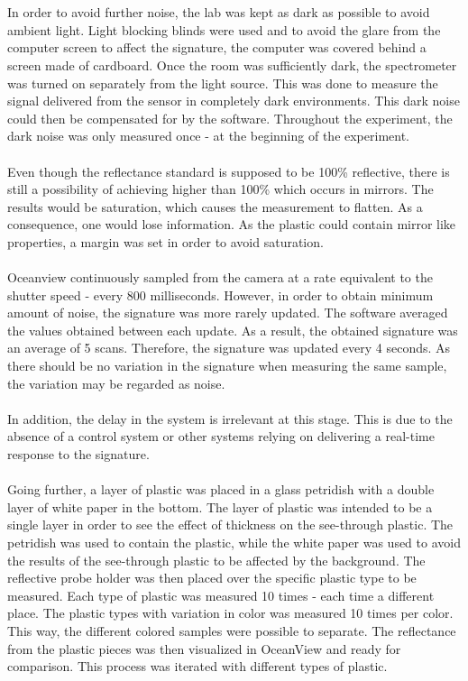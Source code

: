 \\\\
\noindent
In order to avoid further noise, the lab was kept as dark as possible to avoid ambient light. Light blocking blinds were used and to avoid the glare from the computer screen to affect the signature, the computer was covered behind a screen made of cardboard. Once the room was sufficiently dark, the spectrometer was turned on separately from the light source. This was done to measure the signal delivered from the sensor in completely dark environments. This dark noise could then be compensated for by the software. Throughout the experiment, the dark noise was only measured once - at the beginning of the experiment.
\\\\
Even though the reflectance standard is supposed to be 100\% reflective, there is still a possibility of achieving higher than 100\% which occurs in mirrors. The results would be saturation, which causes the measurement to flatten. As a consequence, one would lose information. As the plastic could contain mirror like properties, a margin was set in order to avoid saturation.
\\\\
Oceanview continuously sampled from the camera at a rate equivalent to the shutter speed - every 800 milliseconds. However, in order to obtain minimum amount of noise, the signature was more rarely updated. The software averaged the values obtained between each update. As a result, the obtained signature was an average of 5 scans. Therefore, the signature was updated every 4 seconds. As there should be no variation in the signature when measuring the same sample, the variation may be regarded as noise. 
\\\\
In addition, the delay in the system is irrelevant at this stage. This is due to the absence of a control system or other systems relying on delivering a real-time response to the signature.
\\\\
Going further, a layer of plastic was placed in a glass petridish with a double layer of white paper in the bottom. The layer of plastic was intended to be a single layer in order to see the effect of thickness on the see-through plastic. The petridish was used to contain the plastic, while the white paper was used to avoid the results of the see-through plastic to be affected by the background. The reflective probe holder was then placed over the specific plastic type to be measured. Each type of plastic was measured 10 times - each time a different place. The plastic types with variation in color was measured 10 times per color. This way, the different colored samples were possible to separate. The reflectance from the plastic pieces was then visualized in OceanView and ready for comparison. This process was iterated with different types of plastic. 

